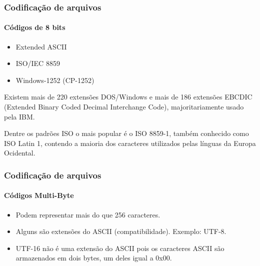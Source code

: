 \begin{frame}
\frametitle{Codificação de arquivos}
\framesubtitle{Códigos de 8 bits}
  \begin{itemize}
  \item Extended ASCII 
  \item ISO/IEC 8859
  \item Windows-1252 (CP-1252)
  \end{itemize}

  Existem mais de 220 extensões DOS/Windows e 
  mais de 186 extensões EBCDIC (Extended Binary Coded Decimal Interchange Code),
  majoritariamente usado pela IBM.

  Dentre os padrões ISO o mais popular é o ISO 8859-1, também conhecido como ISO Latin 1,
  contendo a maioria dos caracteres utilizados pelas línguas da Europa Ocidental.
\end{frame}



\begin{frame}
\frametitle{Codificação de arquivos}
\framesubtitle{Códigos Multi-Byte}
  \begin{itemize}
  \item Podem representar mais do que 256 caracteres.
  \item Alguns são extensões do ASCII (compatibilidade). Exemplo: UTF-8.
  \item UTF-16 não é uma extensão do ASCII pois os caracteres ASCII são armazenados em dois bytes, um deles igual a 0x00.
  \end{itemize}
\end{frame}


